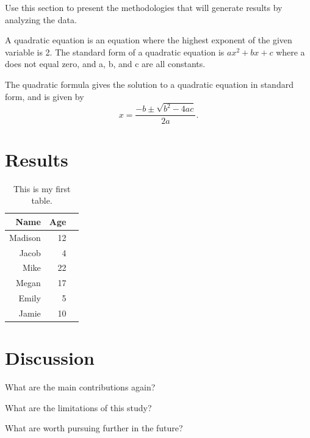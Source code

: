 \documentclass[12pt]{article}
\begin{document}
 Use this section to present the methodologies that will generate results by analyzing the data.

 A quadratic equation is an equation where the highest exponent of the given variable is 2. The standard form of a quadratic equation is $ax^2 + bx +c$ where a does not equal zero, and a, b, and c are all constants.

 The quadratic formula gives the solution to a quadratic equation in standard form, and is given by $$x=\frac{-b\pm\sqrt{b^2-4ac}}{2a}.$$

 \section{Results}
 \label{sec:results}

 \begin{table}[H]
    \caption{This is my first table.}
    \label{tab:rv}
  \centering
  \begin{tabular}{rrr}
    \hline
  Name & Age \\ 
    \hline
    Madison & 12 \\ 
    Jacob & 4 \\ 
    Mike & 22 \\ 
    Megan & 17 \\ 
    Emily & 5 \\ 
    Jamie & 10 \\ 
     \hline
  \end{tabular}
  \end{table}

 \section{Discussion}
 \label{sec:disc}

 What are the main contributions again?

 What are the limitations of this study?

 What are worth pursuing further in the future?




 
\end{document}
